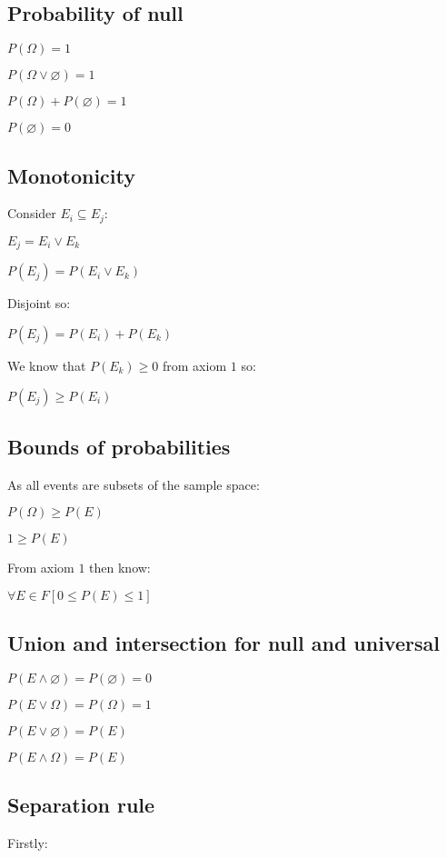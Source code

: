 
\subsection{Probability of null}

\(P(\Omega )=1\)

\(P(\Omega \lor \varnothing )=1\)

\(P(\Omega )+P(\varnothing )=1\)

\(P(\varnothing )=0\)

\subsection{Monotonicity}

Consider \(E_i\subseteq E_j\):

\(E_j=E_i\lor E_k\)

\(P(E_j)=P(E_i\lor E_k)\)

Disjoint so:

\(P(E_j)=P(E_i)+P(E_k)\)

We know that \(P(E_k)\ge 0\) from axiom \(1\) so:

\(P(E_j)\ge P(E_i)\)

\subsection{Bounds of probabilities}

As all events are subsets of the sample space:

\(P(\Omega )\ge P(E)\)

\(1\ge P(E)\)

From axiom \(1\) then know:

\(\forall E\in F [0\le P(E)\le 1]\)

\subsection{Union and intersection for null and universal}

\(P(E\land \varnothing )=P(\varnothing )=0\)

\(P(E\lor \Omega )=P(\Omega )=1\)

\(P(E\lor \varnothing)=P(E)\)

\(P(E\land \Omega )=P(E)\)

\subsection{Separation rule}

Firstly:


